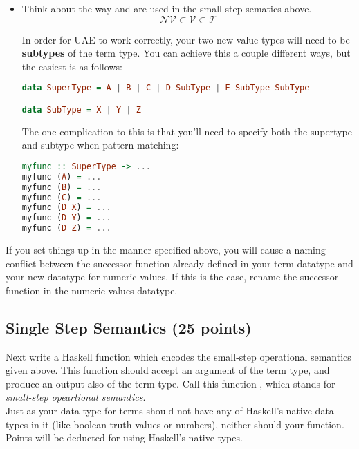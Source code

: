 \documentclass{exam}
\let\OldTexttt\texttt
\renewcommand{\texttt}[1]{\OldTexttt{\color{teal}{#1}}}
\begin{document}
\begin{itemize}
\item Think about the way \texttt{v} and \texttt{nv} are used in the small step sematics above.   \\

$$\mathcal{NV} \subset \mathcal{V} \subset \mathcal{T}$$

In order for UAE to work correctly, your two new value types will need to be \textbf{subtypes} of the term type.  You can achieve this a couple different ways, but the easiest is as follows: \\

\begin{lstlisting}[style=c, language=haskell]
data SuperType = A | B | C | D SubType | E SubType SubType

data SubType = X | Y | Z
\end{lstlisting}

The one complication to this is that you'll need to specify both the supertype and subtype when pattern matching: \\

\begin{lstlisting}[style=c, language=haskell]
myfunc :: SuperType -> ...
myfunc (A) = ...
myfunc (B) = ...
myfunc (C) = ...
myfunc (D X) = ...
myfunc (D Y) = ...
myfunc (D Z) = ... 
\end{lstlisting}

\end{itemize}

If you set things up in the manner specified above, you will cause a naming conflict between the successor function already defined in your term datatype and your new datatype for numeric values.  If this is the case, rename the successor function in the numeric values datatype.  \\


\subsection{Single Step Semantics (25 points)}

Next write a Haskell function which encodes the small-step operational semantics given above.  This function should accept an argument of the term type, and produce an output also of the term type. Call this function \texttt{ssos}, which stands for \emph{small-step opeartional semantics}.  \\

Just as your data type for terms should not have any of Haskell's native data types in it (like boolean truth values or numbers), neither should your function.  Points will be deducted for using Haskell's native types.  \\
\end{document}
